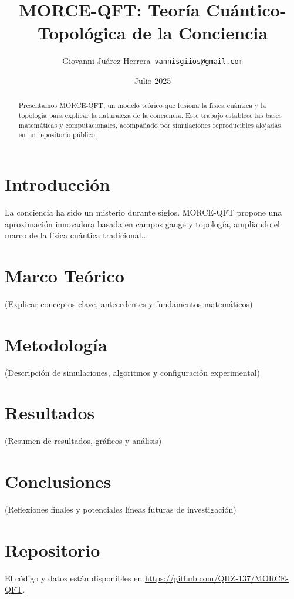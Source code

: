 \documentclass[11pt]{article}
\title{MORCE-QFT: Teoría Cuántico-Topológica de la Conciencia}
\author{Giovanni Juárez Herrera\
\texttt{vannisgiios@gmail.com}
}
\date{Julio 2025}
\begin{document}
\maketitle

\begin{abstract}
Presentamos MORCE-QFT, un modelo teórico que fusiona la física cuántica y la topología para explicar la naturaleza de la conciencia. Este trabajo establece las bases matemáticas y computacionales, acompañado por simulaciones reproducibles alojadas en un repositorio público.
\end{abstract}

\section{Introducción}
La conciencia ha sido un misterio durante siglos. MORCE-QFT propone una aproximación innovadora basada en campos gauge y topología, ampliando el marco de la física cuántica tradicional...

\section{Marco Teórico}
(Explicar conceptos clave, antecedentes y fundamentos matemáticos)

\section{Metodología}
(Descripción de simulaciones, algoritmos y configuración experimental)

\section{Resultados}
(Resumen de resultados, gráficos y análisis)

\section{Conclusiones}
(Reflexiones finales y potenciales líneas futuras de investigación)

\section*{Repositorio}
El código y datos están disponibles en \url{https://github.com/QHZ-137/MORCE-QFT}.
\end{document}
